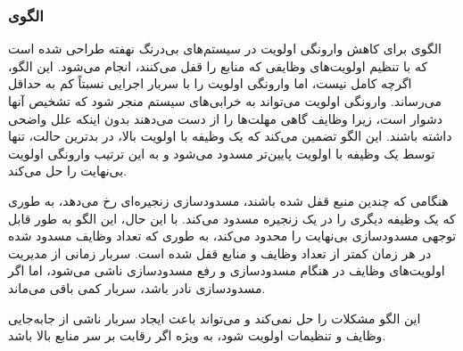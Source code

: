 \subsubsection{الگوی }
\label{resourcePriorInheritSec}
\begin{RTL}
الگوی  برای کاهش وارونگی اولویت
در سیستم‌های بی‌درنگ نهفته طراحی شده است که با تنظیم اولویت‌های
وظایفی که منابع را قفل می‌کنند، انجام می‌شود.
این الگو، اگرچه کامل نیست، اما وارونگی اولویت را با سربار اجرایی
نسبتاً کم به حداقل می‌رساند. وارونگی اولویت می‌تواند به خرابی‌های
سیستم منجر شود که تشخیص آنها دشوار است، زیرا وظایف گاهی
مهلت‌ها را از دست می‌دهند بدون اینکه علل واضحی داشته باشند.
این الگو تضمین می‌کند که یک وظیفه با اولویت بالا، در بدترین حالت،
تنها توسط یک وظیفه با اولویت پایین‌تر مسدود می‌شود و
به این ترتیب وارونگی اولویت بی‌نهایت را حل می‌کند.
\end{RTL}
\begin{RTL}
هنگامی که چندین منبع قفل شده باشند، مسدودسازی زنجیره‌ای
رخ می‌دهد، به طوری که یک وظیفه دیگری را در یک زنجیره
مسدود می‌کند. با این حال، این الگو به طور قابل توجهی مسدودسازی بی‌نهایت
را محدود می‌کند، به طوری که تعداد وظایف مسدود شده در
هر زمان کمتر از تعداد وظایف و منابع قفل شده است.
سربار زمانی از مدیریت اولویت‌های وظایف در هنگام مسدودسازی
و رفع مسدودسازی ناشی می‌شود، اما اگر مسدودسازی نادر باشد،
سربار کمی باقی می‌ماند.
\end{RTL}
\begin{RTL}
این الگو مشکلات  را حل نمی‌کند و می‌تواند باعث ایجاد سربار ناشی
از جابه‌جایی وظایف و تنظیمات اولویت شود، به ویژه اگر رقابت بر سر منابع بالا باشد.
\end{RTL}